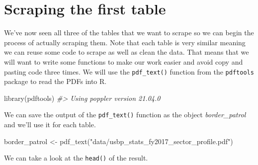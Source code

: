 \documentclass[
]{krantz}
\makeatletter
\newenvironment{Shaded}{\begin{snugshade}}{\end{snugshade}}
\newcommand{\CommentTok}[1]{\textcolor[rgb]{0.37,0.37,0.37}{\textit{#1}}}
\newcommand{\FunctionTok}[1]{\textcolor[rgb]{0,0,0}{#1}}
\newcommand{\NormalTok}[1]{#1}
\newcommand{\OtherTok}[1]{\textcolor[rgb]{0.37,0.37,0.37}{#1}}
\newcommand{\StringTok}[1]{\textcolor[rgb]{0.5,0.5,0.5}{#1}}
\newenvironment{kframe}{%
\medskip{}
\setlength{\fboxsep}{.8em}
 \def\at@end@of@kframe{}%
 \ifinner\ifhmode%
  \def\at@end@of@kframe{\end{minipage}}%
  \begin{minipage}{\columnwidth}%
 \fi\fi%
 \def\FrameCommand##1{\hskip\@totalleftmargin \hskip-\fboxsep
 \colorbox{shadecolor}{##1}\hskip-\fboxsep
     \hskip-\linewidth \hskip-\@totalleftmargin \hskip\columnwidth}%
 \MakeFramed {\advance\hsize-\width
   \@totalleftmargin\z@ \linewidth\hsize
   \@setminipage}}%
 {\par\unskip\endMakeFramed%
 \at@end@of@kframe}
\renewenvironment{Shaded}{\begin{kframe}}{\end{kframe}}
\makeatother
\begin{document}
\hypertarget{scraping-the-first-table}{%
\section{Scraping the first table}\label{scraping-the-first-table}}

We've now seen all three of the tables that we want to scrape so we can begin the process of actually scraping them. Note that each table is very similar meaning we can reuse some code to scrape as well as clean the data. That means that we will want to write some functions to make our work easier and avoid copy and pasting code three times. We will use the \texttt{pdf\_text()} function from the \texttt{pdftools} package to read the PDFs into R.

\begin{Shaded}
\begin{Highlighting}[]
\FunctionTok{library}\NormalTok{(pdftools)}
\CommentTok{\#\textgreater{} Using poppler version 21.04.0}
\end{Highlighting}
\end{Shaded}

We can save the output of the \texttt{pdf\_text()} function as the object \emph{border\_patrol} and we'll use it for each table.

\begin{Shaded}
\begin{Highlighting}[]
\NormalTok{border\_patrol }\OtherTok{\textless{}{-}} \FunctionTok{pdf\_text}\NormalTok{(}\StringTok{"data/usbp\_stats\_fy2017\_sector\_profile.pdf"}\NormalTok{)}
\end{Highlighting}
\end{Shaded}

We can take a look at the \texttt{head()} of the result.
\end{document}
